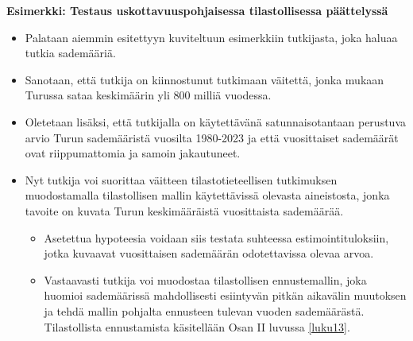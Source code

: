 \documentclass[
]{book}
\providecommand{\tightlist}{%
  \setlength{\itemsep}{0pt}\setlength{\parskip}{0pt}}
\begin{document}
\begin{eblock}{}

\textbf{Esimerkki: Testaus uskottavuuspohjaisessa tilastollisessa päättelyssä}

\begin{itemize}
\tightlist
\item
  Palataan aiemmin esitettyyn kuviteltuun esimerkkiin tutkijasta, joka haluaa tutkia sademääriä.
\item
  Sanotaan, että tutkija on kiinnostunut tutkimaan väitettä, jonka mukaan Turussa sataa keskimäärin yli 800 milliä vuodessa.
\item
  Oletetaan lisäksi, että tutkijalla on käytettävänä satunnaisotantaan perustuva arvio Turun sademääristä vuosilta 1980-2023 ja että vuosittaiset sademäärät ovat riippumattomia ja samoin jakautuneet.
\item
  Nyt tutkija voi suorittaa väitteen tilastotieteellisen tutkimuksen muodostamalla tilastollisen mallin käytettävissä olevasta aineistosta, jonka tavoite on kuvata Turun keskimääräistä vuosittaista sademäärää.

  \begin{itemize}
  \tightlist
  \item
    Asetettua hypoteesia voidaan siis testata suhteessa estimointituloksiin, jotka kuvaavat vuosittaisen sademäärän odotettavissa olevaa arvoa.
  \item
    Vastaavasti tutkija voi muodostaa tilastollisen ennustemallin, joka huomioi sademäärissä mahdollisesti esiintyvän pitkän aikavälin muutoksen ja tehdä mallin pohjalta ennusteen tulevan vuoden sademäärästä. Tilastollista ennustamista käsitellään Osan II luvussa \ref{luku13}.
  \end{itemize}
\end{itemize}

\end{eblock}
\end{document}
